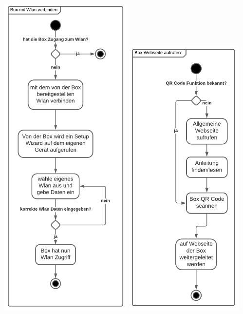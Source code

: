 \documentclass[10pt, a4paper]{article}
\begin{document}
  \includegraphics[width=0.5\textwidth]{box mit wlan verbinden.png}
  \newpage
  \includegraphics[width=0.45\textwidth]{box website aufrufen.png}
\end{document}
